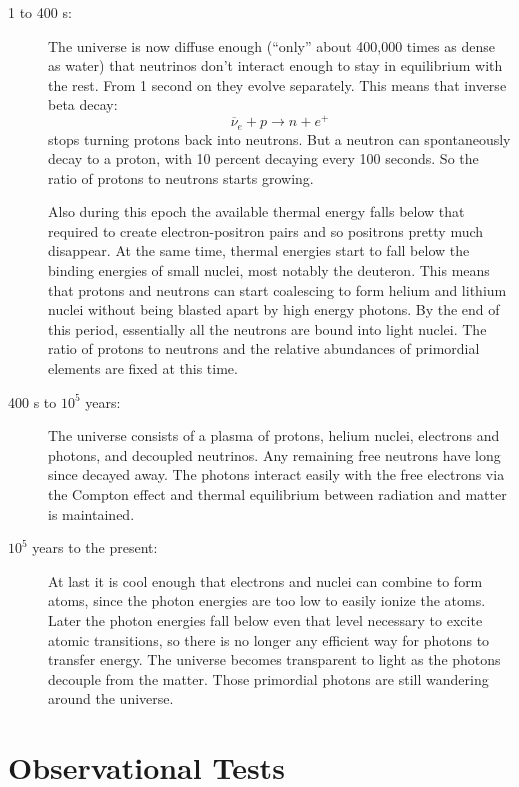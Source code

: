 \begin{description}
\item[1 to 400 s:] The universe is now diffuse enough (``only'' about
  400,000 times as dense as water) that neutrinos don't interact
  enough to stay in equilibrium with the rest.  From 1 second on they
  evolve separately.  This means that inverse beta decay:
  \begin{equation}
    \overline\nu_e + p \to n + e^+
  \end{equation}
  stops turning protons back into neutrons.  But a neutron can
  spontaneously decay to a proton, with 10 percent decaying every 100
  seconds.  So the ratio of protons to neutrons starts growing.

  Also during this epoch the available thermal energy falls below that
  required to create electron-positron pairs and so positrons pretty
  much disappear. At the same time, thermal energies start to fall
  below the binding energies of small nuclei, most notably the
  deuteron.  This means that protons and neutrons can start coalescing
  to form helium and lithium nuclei without being blasted apart by
  high energy photons. By the end of this period, essentially all the
  neutrons are bound into light nuclei. The ratio of protons to
  neutrons and the relative abundances of primordial elements are
  fixed at this time.

\item[400 s to $10^5$ years:] The universe consists of a plasma of
  protons, helium nuclei, electrons and photons, and decoupled
  neutrinos. Any remaining free neutrons have long since decayed away.
  The photons interact easily with the free electrons via the Compton
  effect and thermal equilibrium between radiation and matter is
  maintained.

\item[$10^5$ years to the present:] At last it is cool enough that
  electrons and nuclei can combine to form atoms, since the photon
  energies are too low to easily ionize the atoms.  Later the photon
  energies fall below even that level necessary to excite atomic
  transitions, so there is no longer any efficient way for photons to
  transfer energy.  The universe becomes transparent to light as the
  photons decouple from the matter. Those primordial photons are still
  wandering around the universe.
\end{description}


\section{Observational Tests}
\label{sec:observational_tests}

